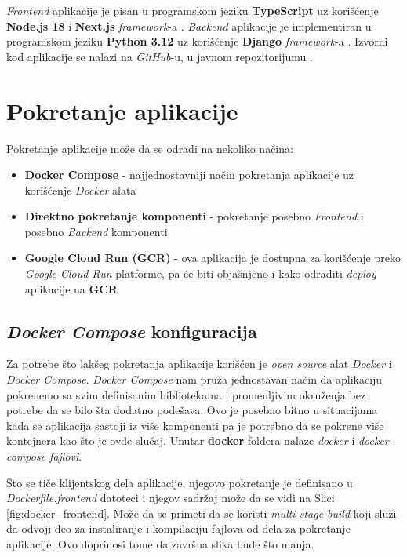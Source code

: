 \documentclass[12pt,oneside]{memoir}
\begin{document}
\emph{Frontend} aplikacije je pisan u programskom jeziku \textbf{TypeScript} \cite{typescript} uz korišćenje \textbf{Node.js 18} \cite{node} i \textbf{Next.js} \emph{framework}-a \cite{next}.
\emph{Backend} aplikacije je implementiran u programskom jeziku \textbf{Python 3.12} \cite{python} uz korišćenje \textbf{Django} \emph{framework}-a \cite{django}. Izvorni kod aplikacije se nalazi na \emph{GitHub}-u, u javnom repozitorijumu \cite{github}.

\section{Pokretanje aplikacije}

Pokretanje aplikacije može da se odradi na nekoliko načina:
\begin{itemize}
    \item \textbf{Docker Compose} \cite{docker_compose} - najjednostavniji način pokretanja aplikacije uz korišćenje \emph{Docker} alata \cite{docker}
    \item \textbf{Direktno pokretanje komponenti} - pokretanje posebno \emph{Frontend} i posebno \emph{Backend} komponenti
    \item \textbf{Google Cloud Run (GCR)} \cite{gcr} - ova aplikacija je dostupna za korišćenje preko \emph{Google Cloud Run} platforme, pa će biti objašnjeno i kako odraditi \emph{deploy} aplikacije na \textbf{GCR}
\end{itemize}

\subsection{\emph{Docker Compose} konfiguracija}
Za potrebe što lakšeg pokretanja aplikacije korišćen je \emph{open source} alat \emph{Docker} i \emph{Docker Compose}. \emph{Docker Compose} nam pruža jednostavan način da aplikaciju pokrenemo sa svim definisanim bibliotekama i promenljivim okruženja bez potrebe da se bilo šta dodatno podešava. Ovo je posebno bitno u situacijama kada se aplikacija sastoji iz više komponenti pa je potrebno da se pokrene više kontejnera kao što je ovde slučaj.
Unutar \textbf{docker} foldera nalaze \emph{docker} i \emph{docker-compose fajlovi}.

Što se tiče klijentskog dela aplikacije, njegovo pokretanje je definisano u \emph{Dockerfile.frontend} datoteci i njegov sadržaj može da se vidi na Slici \ref{fig:docker_frontend}. Može da se primeti da se koristi \emph{multi-stage build} koji služi da odvoji deo za instaliranje i kompilaciju fajlova od dela za pokretanje aplikacije. Ovo doprinosi tome da završna slika bude što manja.
\end{document}
